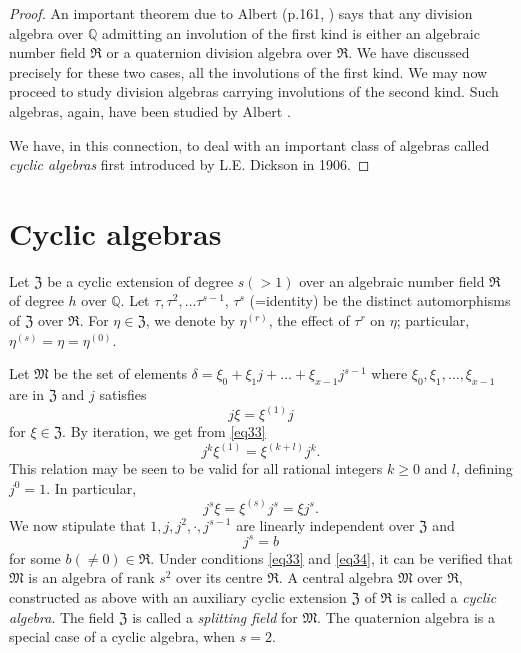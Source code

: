 \begin{proof}
An important theorem due to Albert (p.161, \cite{1}) says that any
division algebra over $\mathbb{Q}$ admitting an involution of the
first kind is either an algebraic number field $\mathfrak{R}$ or a
quaternion division algebra over $\mathfrak{R}$. We have discussed
precisely for these two cases, all the involutions of the first
kind. We may now proceed to study division algebras carrying
involutions of the second kind. Such algebras, again, have been
studied by Albert \cite{1}.

We have, in this connection, to deal with an important class of
algebras called {\em cyclic algebras} first introduced by
L.E. Dickson in 1906.
\end{proof}

\section{Cyclic algebras}\pageoriginale
Let $\mathfrak{Z}$ be a cyclic extension of degree $s(>1)$ over an
algebraic number field $\mathfrak{R}$ of degree $h$ over
$\mathbb{Q}$. Let $\tau, \tau^2,\ldots \tau^{s-1}$, $\tau^s$
(=identity) be the distinct automorphisms of $\mathfrak{Z}$ over
$\mathfrak{R}$. For $\eta \in \mathfrak{Z}$, we denote by
$\eta^{(r)}$, the effect of $\tau^r$ on $\eta$; particular,
$\eta^{(s)} = \eta=\eta^{(0)}$.

Let $\mathfrak{M}$ be the set of elements $\delta = \xi_0 + \xi_1 j +
\ldots + \xi_{x-1} j^{s-1}$ where $\xi_0, \xi_1,\ldots, \xi_{x-1}$ are
in $\mathfrak{Z}$ and $j$ satisfies
\begin{equation*}
j \xi = \xi^{(1)} j \tag{33}\label{eq33}
\end{equation*}\pageoriginale
for $\xi \in \mathfrak{Z}$. By iteration, we get from \eqref{eq33}
$$
j^k \xi^{(1)} = \xi^{(k+l)} j^k.
$$
This relation may be seen to be valid for all rational integers $k\geq
0$ and $l$, defining $j^0=1$. In particular,
$$
j^s \xi = \xi^{(s)} j^s = \xi j^s.
$$
We now stipulate that $1, j, j^2, \cdot, j^{s-1}$ are linearly
independent over $\mathfrak{Z}$ and 
\begin{equation*}
j^s = b \tag{34}\label{eq34}
\end{equation*}
for some $b(\neq 0) \in \mathfrak{R}$. Under conditions \eqref{eq33} and \eqref{eq34},
it can be verified that $\mathfrak{M}$ is an algebra of rank $s^2$
over its centre $\mathfrak{R}$. A central algebra $\mathfrak{M}$ over
$\mathfrak{R}$, constructed as above with an auxiliary cyclic
extension $\mathfrak{Z}$ of $\mathfrak{R}$ is called a {\em cyclic
  algebra}. The field $\mathfrak{Z}$ is called a {\em splitting field}
for $\mathfrak{M}$. The quaternion algebra is a special case of a
cyclic algebra, when $s=2$.

